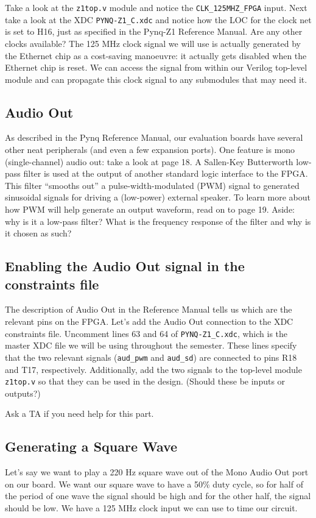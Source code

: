 \documentclass[11pt]{article}
\begin{document}
Take a look at the \verb|z1top.v| module and notice the \verb|CLK_125MHZ_FPGA| input. Next take a look at the XDC \verb|PYNQ-Z1_C.xdc| and notice how the LOC for the clock net is set to H16, just as specified in the Pynq-Z1 Reference Manual. Are any other clocks available? The 125 MHz clock signal we will use is actually generated by the Ethernet chip as a cost-saving manoeuvre: it actually gets disabled when the Ethernet chip is reset. We can access the signal from within our Verilog top-level module and can propagate this clock signal to any submodules that may need it.

\subsection{Audio Out}

As described in the Pynq Reference Manual, our evaluation boards have several other neat peripherals (and even a few expansion ports). One feature is mono (single-channel) audio out: take a look at page 18. A Sallen-Key Butterworth low-pass filter is used at the output of another standard logic interface to the FPGA. This filter ``smooths out'' a pulse-width-modulated (PWM) signal to generated sinusoidal signals for driving a (low-power) external speaker. To learn more about how PWM will help generate an output waveform, read on to page 19. Aside: why is it a low-pass filter? What is the frequency response of the filter and why is it chosen as such?

\subsection{Enabling the Audio Out signal in the constraints file}

The description of Audio Out in the Reference Manual tells us which are the relevant pins on the FPGA. Let's add the Audio Out connection to the XDC constraints file. Uncomment lines 63 and 64 of \verb|PYNQ-Z1_C.xdc|, which is the master XDC file we will be using throughout the semester. These lines specify that the two relevant signals (\verb|aud_pwm| and \verb|aud_sd|) are connected to pins R18 and T17, respectively. Additionally, add the two signals to the top-level module \verb|z1top.v| so that they can be used in the design. (Should these be inputs or outputs?)

Ask a TA if you need help for this part.

\subsection{Generating a Square Wave}
Let's say we want to play a 220 Hz square wave out of the Mono Audio Out port on our board. We want our square wave to have a 50\% duty cycle, so for half of the period of one wave the signal should be high and for the other half, the signal should be low. We have a 125 MHz clock input we can use to time our circuit.
\end{document}
